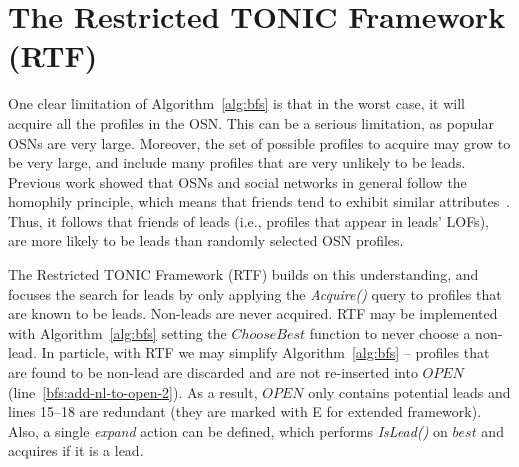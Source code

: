 \documentclass[prodmode,acmtecs]{acmsmall} %
\newcommand{\note}[2]{\textbf{\textsc{#1} says: \textit{#2}}}
\newcommand{\islead}[1]{{\em IsLead(#1)}}
\newcommand{\acquire}[1]{{\em Acquire(#1)}}
\begin{document}


\section{The Restricted TONIC Framework (RTF)}
\label{sec:rtf}

One clear limitation of Algorithm~\ref{alg:bfs} is that in the worst case, it will acquire all the profiles in the OSN. This can be a serious limitation, as popular OSNs are very large. Moreover, the set of possible profiles to acquire may grow to be very large, and include many profiles that are very unlikely to be leads. Previous work showed that OSNs and social networks in general follow the homophily principle, which means that friends tend to exhibit similar attributes~\cite{mcpherson2001birds,altshuler2012security,fire2012predictingStudent}. Thus, it follows that friends of leads (i.e., profiles that appear in leads' LOFs), are more likely to be leads than randomly selected OSN profiles. 

The Restricted TONIC Framework (RTF) builds on this understanding, and focuses the search for leads by only applying the \acquire{} query to profiles that are known to be leads. Non-leads are never acquired. 
RTF may be implemented with Algorithm~\ref{alg:bfs} setting the $ChooseBest$ function to never choose a non-lead. In particle, with RTF we may simplify Algorithm~\ref{alg:bfs} --  profiles that are found to be non-lead are discarded and are not re-inserted into $OPEN$ (line~\ref{bfs:add-nl-to-open-2}). As a result, $OPEN$ only contains potential leads and lines 15--18 are redundant (they are marked with E for extended framework). 
Also, a single {\em expand} action can be defined, which performs \islead{} on $best$ and acquires if it is a lead. %
\end{document}
